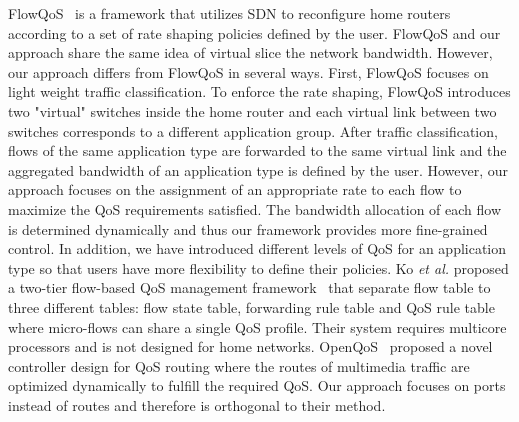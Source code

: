 FlowQoS~\cite{Seddiki_HotSDN14} is a framework that utilizes SDN to reconfigure home routers according to a set of rate shaping
policies defined by the user. FlowQoS and our approach share the same idea of virtual slice the network bandwidth. However,
our approach differs from FlowQoS in several ways. First, FlowQoS focuses on light weight traffic classification. To enforce
the rate shaping, FlowQoS introduces two "virtual" switches inside the home router and each virtual link between two switches 
corresponds to a different application group. After traffic classification, flows of the same application type are forwarded to
the same virtual link and the aggregated bandwidth of an application type is defined by the user. However, our approach focuses
on the assignment of an appropriate rate to each flow to maximize the QoS requirements satisfied. The bandwidth allocation of each
flow is determined dynamically and thus our framework provides more fine-grained control. In addition, we have introduced different
levels of QoS for an application type so that users have more flexibility to define their policies. Ko \textit{et al.}\xspace proposed a two-tier
flow-based QoS management framework~\cite{Ko_IEICE13} that separate flow table to three different tables: flow state table, forwarding
rule table and QoS rule table where micro-flows can share a single QoS profile. Their system requires multicore processors and is
not designed for home networks. OpenQoS~\cite{Egilmez_ASPIPA12} proposed a novel controller design for QoS routing where the routes of
multimedia traffic are optimized dynamically to fulfill the required QoS. Our approach focuses on ports instead of routes and therefore
is orthogonal to their method.
